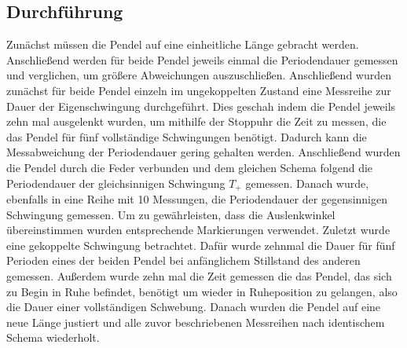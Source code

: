 \subsection{Durchführung}
Zunächst müssen die Pendel auf eine einheitliche Länge gebracht werden. 
Anschließend werden für beide Pendel jeweils einmal die Periodendauer gemessen 
und verglichen, um größere Abweichungen auszuschließen. Anschließend wurden zunächst 
für beide Pendel einzeln im ungekoppelten Zustand eine Messreihe zur Dauer der Eigenschwingung 
durchgeführt. Dies geschah indem die Pendel jeweils zehn mal ausgelenkt wurden, um mithilfe der 
Stoppuhr die Zeit zu messen, die das Pendel für fünf vollständige Schwingungen benötigt. Dadurch 
kann die Messabweichung der Periodendauer gering gehalten werden. \newline Anschließend wurden die 
Pendel durch die Feder verbunden und dem gleichen Schema folgend die Periodendauer der gleichsinnigen 
Schwingung $T_+$ gemessen.  \newline Danach wurde, ebenfalls in eine Reihe mit 10 Messungen, 
die Periodendauer der gegensinnigen Schwingung gemessen. Um zu gewährleisten, dass die Auslenkwinkel 
übereinstimmen wurden entsprechende Markierungen verwendet. \newline Zuletzt wurde eine gekoppelte 
Schwingung betrachtet. Dafür wurde zehnmal die Dauer für fünf Perioden eines der beiden Pendel bei 
anfänglichem Stillstand des anderen gemessen. Außerdem wurde zehn mal die Zeit gemessen die das Pendel, 
das sich zu Begin in Ruhe befindet, benötigt um wieder in Ruheposition zu gelangen, also die Dauer einer 
vollständigen Schwebung. Danach wurden die Pendel auf eine neue Länge justiert und alle zuvor beschriebenen 
Messreihen nach identischem Schema wiederholt. 
